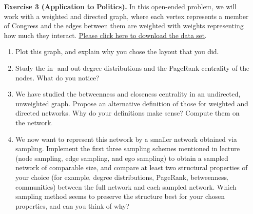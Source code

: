 \documentclass{article}
\begin{document}
\vspace{12pt}


\begin{tcolorbox}[colback = gray!16, enhanced, boxrule=0pt, frame hidden, sharp corners, borderline west={3pt}{-1.5pt}{black!80},breakable]
\textbf{Exercise 3 (Application to Politics).} In this open-ended problem, we will work with a weighted and directed graph, where each vertex represents a member of Congress and the edges between them are weighted with weights representing how much they interact. \href{https://snap.stanford.edu/data/congress-twitter.html}{\underline{Please click here to download the data set}}.
\begin{enumerate}[$(a)$]
    \item Plot this graph, and explain why you chose the layout that you did.
    \item Study the in- and out-degree distributions and the PageRank centrality of the nodes. What do you notice?
    \item We have studied the betweenness and closeness centrality in an undirected, unweighted graph. Propose an alternative definition of those for weighted and directed networks. Why do your definitions make sense? Compute them on the network.
    \item We now want to represent this network by a smaller network obtained via sampling. Implement the first three sampling schemes mentioned in lecture (node sampling, edge sampling, and ego sampling) to obtain a sampled network of comparable size, and compare at least two structural properties of your choice (for example, degree distributions, PageRank, betweenness, communities) between the full network and each sampled network. Which sampling method seems to preserve the structure best for your chosen properties, and can you think of why?
\end{enumerate}
\end{tcolorbox}
\end{document}

